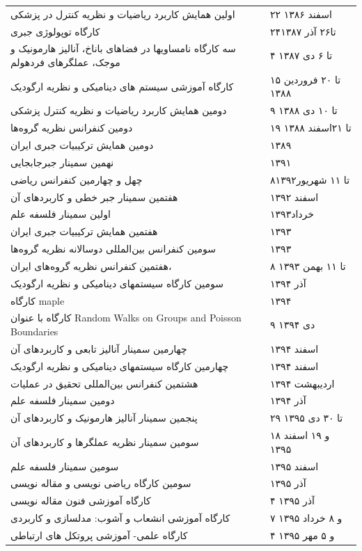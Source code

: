 \documentclass[
  letterpaper,
  DIV=11,
  numbers=noendperiod]{scrreprt}
\begin{document}
{\begin{longtable}[]{@{}
  >{\raggedright\arraybackslash}p{}
  >{\raggedright\arraybackslash}p{}@{}}
اولین همایش کاربرد ریاضیات و نظریه کنترل در پزشکی & ۲۲ اسفند ۱۳۸۶ \\
کارگاه توپولوژی جبری & ۲۴تا۲۶ آذر ۱۳۸۷ \\
سه کارگاه نامساویها در فضاهای باناخ، آنالیز هارمونیک و موجک، عملگرهای
فردهولم & ۴ تا ۶ دی‌ ۱۳۸۷ \\
کارگاه آموزشی سیستم های دینامیکی و نظریه ارگودیک & ۱۵ تا ۲۰ فروردین
۱۳۸۸ \\
دومین همایش کاربرد ریاضیات و نظریه کنترل پزشکی & ۹ تا ۱۰ دی‌ ۱۳۸۸ \\
دومین کنفرانس نظریه گروه‌ها & ۱۹ تا ۲۱اسفند ۱۳۸۸ \\
دومین همایش ترکیبیات جبری ایران & ۱۳۸۹ \\
نهمین سمینار جبرجابجایی & ۱۳۹۱ \\
چهل و چهارمین کنفرانس ریاضی & ۸تا ۱۱ شهریور۱۳۹۲ \\
هفتمین سمینار جبر خطی و کاربردهای آن & اسفند ۱۳۹۲ \\
اولین سمینار فلسفه علم & خرداد۱۳۹۳ \\
هفتمین همایش ترکیبیات جبری ایران & ۱۳۹۳ \\
سومین کنفرانس بین‌المللی دوسالانه نظریه گروه‌ها & ۱۳۹۳ \\
هفتمین کنفرانس نظریه گروه‌های ایران، & ۸ تا ۱۱ بهمن ۱۳۹۳ \\
سومین کارگاه سیستمهای دینامیکی و نظریه ارگودیک & آذر ۱۳۹۴ \\
کارگاه maple & ۱۳۹۴ \\
کارگاه با عنوان Random Walks on Groups and Poisson Boundaries & ۹ دی‌
۱۳۹۴ \\
چهارمین سمینار آنالیز تابعی و کاربردهای آن & اسفند ۱۳۹۴ \\
چهارمین کارگاه سیستمهای دینامیکی و نظریه ارگودیک & اسفند ۱۳۹۴ \\
هشتمین کنفرانس بین‌المللی تحقیق در عملیات & اردیبهشت ۱۳۹۴ \\
دومین سمینار فلسفه علم & آذر ۱۳۹۴ \\
پنجمین سمینار آنالیز هارمونیک و کاربردهای آن & ۲۹ تا ۳۰ دی ۱۳۹۵ \\
سومین سمینار نظریه عملگرها و کاربردهای آن & ۱۸ و ۱۹ اسفند ۱۳۹۵ \\
سومین سمینار فلسفه علم & اسفند ۱۳۹۵ \\
سومین کارگاه ریاضی نویسی و مقاله نویسی & آذر ۱۳۹۵ \\
کارگاه آموزشی فنون مقاله نویسی & ۴ آذر ۱۳۹۵ \\
کارگاه آموزشی انشعاب و آشوب: مدلسازی و کاربردی & ۷ و ۸ خرداد ۱۳۹۵ \\
کارگاه علمی- آموزشی پروتکل های ارتباطی & ۴ و ۵ مهر ۱۳۹۵ \\

\end{longtable}}
\end{document}
